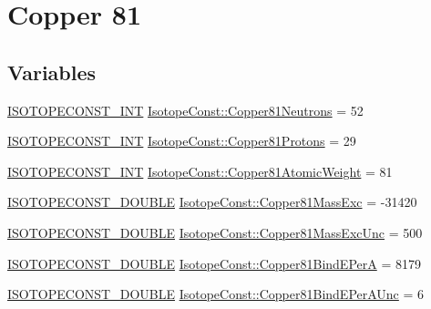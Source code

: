 \hypertarget{group___isotope_const-_copper-_cu81}{}\section{Copper 81}
\label{group___isotope_const-_copper-_cu81}
\subsection*{Variables}
\begin{DoxyCompactItemize}
\item 
\mbox{\hyperlink{group___isotope_const-_macros_ga5f18360b3e99483a35c32d789e62621c}{I\+S\+O\+T\+O\+P\+E\+C\+O\+N\+S\+T\+\_\+\+I\+NT}} \mbox{\hyperlink{group___isotope_const-_copper-_cu81_ga4d83a1ccfe043c42b17e105808d502dc}{Isotope\+Const\+::\+Copper81\+Neutrons}} = 52
\item 
\mbox{\hyperlink{group___isotope_const-_macros_ga5f18360b3e99483a35c32d789e62621c}{I\+S\+O\+T\+O\+P\+E\+C\+O\+N\+S\+T\+\_\+\+I\+NT}} \mbox{\hyperlink{group___isotope_const-_copper-_cu81_ga371215c45852ae76b31a565c19358bb8}{Isotope\+Const\+::\+Copper81\+Protons}} = 29
\item 
\mbox{\hyperlink{group___isotope_const-_macros_ga5f18360b3e99483a35c32d789e62621c}{I\+S\+O\+T\+O\+P\+E\+C\+O\+N\+S\+T\+\_\+\+I\+NT}} \mbox{\hyperlink{group___isotope_const-_copper-_cu81_gad66b777a6222066ea04c44733d366a11}{Isotope\+Const\+::\+Copper81\+Atomic\+Weight}} = 81
\item 
\mbox{\hyperlink{group___isotope_const-_macros_ga8f45a7272ce02c0b4c65c44636ed719a}{I\+S\+O\+T\+O\+P\+E\+C\+O\+N\+S\+T\+\_\+\+D\+O\+U\+B\+LE}} \mbox{\hyperlink{group___isotope_const-_copper-_cu81_gadb69b139e2243ad434d0b0674698fc64}{Isotope\+Const\+::\+Copper81\+Mass\+Exc}} = -\/31420
\item 
\mbox{\hyperlink{group___isotope_const-_macros_ga8f45a7272ce02c0b4c65c44636ed719a}{I\+S\+O\+T\+O\+P\+E\+C\+O\+N\+S\+T\+\_\+\+D\+O\+U\+B\+LE}} \mbox{\hyperlink{group___isotope_const-_copper-_cu81_gaefaba0650d8c5c6c3f3cfd5a99f6f02f}{Isotope\+Const\+::\+Copper81\+Mass\+Exc\+Unc}} = 500
\item 
\mbox{\hyperlink{group___isotope_const-_macros_ga8f45a7272ce02c0b4c65c44636ed719a}{I\+S\+O\+T\+O\+P\+E\+C\+O\+N\+S\+T\+\_\+\+D\+O\+U\+B\+LE}} \mbox{\hyperlink{group___isotope_const-_copper-_cu81_gae0f5370cfdbaa0b0ff53127542d25405}{Isotope\+Const\+::\+Copper81\+Bind\+E\+PerA}} = 8179
\item 
\mbox{\hyperlink{group___isotope_const-_macros_ga8f45a7272ce02c0b4c65c44636ed719a}{I\+S\+O\+T\+O\+P\+E\+C\+O\+N\+S\+T\+\_\+\+D\+O\+U\+B\+LE}} \mbox{\hyperlink{group___isotope_const-_copper-_cu81_ga92559c1247980e2d16b7bbdf995eb28d}{Isotope\+Const\+::\+Copper81\+Bind\+E\+Per\+A\+Unc}} = 6

\end{DoxyCompactItemize}
